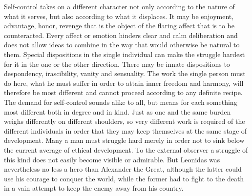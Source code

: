 \documentclass[12pt,a4paper,openany]{book}
\newcommand{\opage}[1]{\marginnote{\footnotesize\textit{[#1]}}}
\begin{document}
Self-control takes on a different character not only according to the nature of what it serves, but also according
to what it displaces. It may be enjoyment, advantage, honor, revenge that is the object of the flaring affect that
is to be counteracted. Every affect or emotion hinders clear and calm deliberation and does not allow ideas to
combine in the way that would otherwise be natural to them. Special dispositions in the single individual can make
the struggle hardest for it in the one or the other direction. There may be innate dispositions to despondency,
irascibility, vanity and sensuality. The work the single person must do here, what he must suffer in order to
attain inner freedom and harmony, will therefore be most different and cannot proceed according to any definite
recipe. The demand for self-control sounds alike to all, but means for each something most different both in
degree and in kind. Just as one and the same burden weighs differently on different shoulders, so very different
work is required of the different individuals in order that they may keep themselves at the same stage of
development. Many a man must struggle hard merely in order not to sink below the current average of ethical
development. To the external observer a struggle
\opage{223}of this kind does not easily become visible or admirable. But Leonidas was nevertheless no less a hero than
Alexander the Great, although the latter could use his courage to conquer the world, while the former had to fight
to the death in a vain attempt to keep the enemy away from his country.
\end{document}
